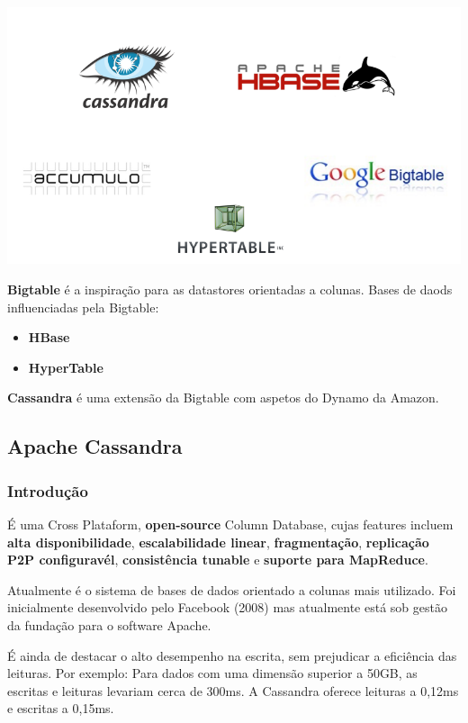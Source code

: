 \documentclass{article}
\begin{document}
\begin{center}
  \includegraphics[scale=0.3]{12}
\end{center}

\textbf{Bigtable} é a inspiração para as datastores orientadas a colunas.
Bases de daods influenciadas pela Bigtable:
\begin{itemize}
  \item \textbf{HBase}
  \item \textbf{HyperTable}
\end{itemize}

\textbf{Cassandra} é uma extensão da Bigtable com aspetos do Dynamo da Amazon.

\pagebreak

\subsection{Apache Cassandra}

\subsubsection{Introdução}

É uma Cross Plataform, \textbf{open-source} Column Database, cujas features incluem
\textbf{alta disponibilidade}, \textbf{escalabilidade linear},
\textbf{fragmentação}, \textbf{replicação P2P configuravél},
\textbf{consistência tunable} e \textbf{suporte para MapReduce}.

Atualmente é o sistema de bases de dados orientado a colunas mais utilizado.
Foi inicialmente desenvolvido pelo Facebook (2008) mas atualmente está sob gestão da
fundação para o software Apache.

É ainda de destacar o alto desempenho na escrita, sem prejudicar a eficiência das leituras.
Por exemplo: Para dados com uma dimensão superior a 50GB, as escritas e leituras levariam cerca de 300ms. A Cassandra oferece
leituras a 0,12ms e escritas a 0,15ms.
\end{document}

